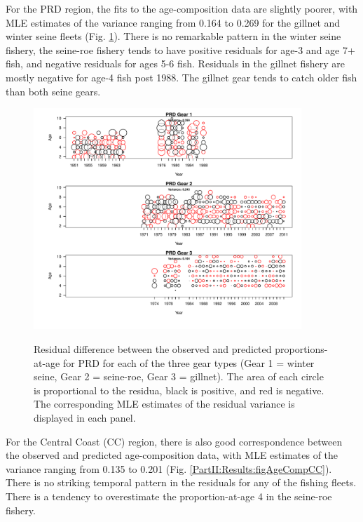 For the PRD region, the fits to the age-composition data are slightly poorer, with MLE estimates of the variance ranging from 0.164 to 0.269 for the gillnet and winter seine fleets (Fig. \ref{PartII:Results:figAgeCompPRD}). There is no remarkable pattern in the winter seine fishery, the seine-roe fishery tends to have positive residuals for age-3 and age 7+ fish, and negative residuals for ages 5-6 fish. Residuals in the gillnet fishery are mostly negative for age-4 fish post 1988. The gillnet gear tends to catch older fish than both seine gears.

\begin{figure}
	\centering
	\includegraphics[width=0.9\textwidth]{../FIGS/qPriorFigs/iscam_fig_agecompsresid_PRD.pdf}\\
	\caption{Residual difference between the observed and predicted proportions-at-age for PRD for each of the three gear types (Gear 1 = winter seine, Gear 2 = seine-roe, Gear 3 = gillnet).  The area of each circle is proportional to the residua, black is positive, and red is negative.  The corresponding MLE estimates of the residual variance is displayed in each panel.}\label{PartII:Results:figAgeCompPRD}
\end{figure}


For the Central Coast (CC) region, there is also good correspondence between the observed and predicted age-composition data, with MLE estimates of the variance ranging from 0.135 to 0.201 (Fig. \ref{PartII:Results:figAgeCompCC}).  There is no striking temporal pattern in the residuals for any of the fishing fleets.  There is a tendency to overestimate the proportion-at-age 4 in the seine-roe fishery.


